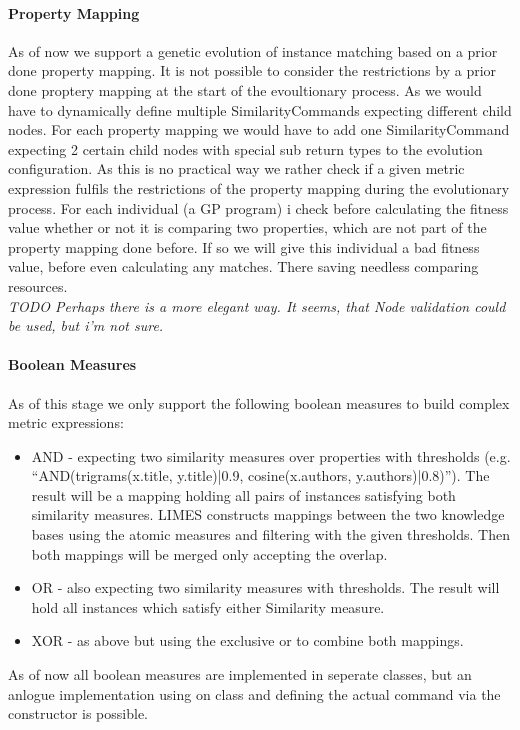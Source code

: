 \documentclass{article}%
\begin{document}
\paragraph{Property Mapping}
\label{sec:propertymapping}

As of now we support a genetic evolution of instance matching based on a prior done property mapping.
It is not possible to consider the restrictions by a prior done proptery mapping at the start of the evoultionary process. As we would have to dynamically define multiple SimilarityCommands expecting different child nodes. For each property mapping we would have to add one SimilarityCommand expecting 2 certain child nodes with special sub return types to the evolution configuration.
As this is no practical way we rather check if a given metric expression fulfils the restrictions of the property mapping during the evolutionary process. For each individual (a GP program) i check before calculating the fitness value whether or not it is comparing two properties, which are not part of the property mapping done before. If so we will give this individual a bad fitness value, before even calculating any matches. There  saving needless comparing resources. \\
\textit{TODO Perhaps there is a more elegant way. It seems, that Node validation could be used, but i'm not sure.}
\paragraph{Boolean Measures}
\label{sec:BooleanMeasures}
As of this stage we only support the following boolean measures to build complex metric expressions:
\begin{itemize}
	\item AND - expecting two similarity measures over properties with thresholds (e.g. ``AND(trigrams(x.title, y.title)|0.9, cosine(x.authors, y.authors)|0.8)''). The result will be a mapping holding all pairs of instances satisfying both similarity measures. LIMES constructs mappings between the two knowledge bases using the atomic measures and filtering with the given thresholds. Then both mappings will be merged only accepting the overlap.
	\item OR - also expecting two similarity measures with thresholds. The result will hold all instances which satisfy either Similarity measure.
	\item XOR - as above but using the exclusive or to combine both mappings.
\end{itemize}
As of now all boolean measures are implemented in seperate classes, but an anlogue implementation using on class and defining the actual command via the constructor is possible.\\
\end{document}
